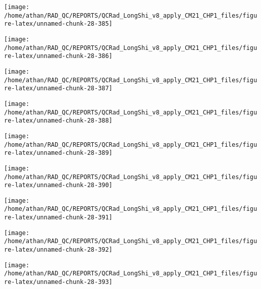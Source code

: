 \documentclass[
  10pt,
  a4paper,oneside]{article}
\begin{document}
\begin{center}\texttt{[image: /home/athan/RAD\_QC/REPORTS/QCRad\_LongShi\_v8\_apply\_CM21\_CHP1\_files/figure-latex/unnamed-chunk-28-385]} \end{center}

\begin{center}\texttt{[image: /home/athan/RAD\_QC/REPORTS/QCRad\_LongShi\_v8\_apply\_CM21\_CHP1\_files/figure-latex/unnamed-chunk-28-386]} \end{center}

\begin{center}\texttt{[image: /home/athan/RAD\_QC/REPORTS/QCRad\_LongShi\_v8\_apply\_CM21\_CHP1\_files/figure-latex/unnamed-chunk-28-387]} \end{center}

\begin{center}\texttt{[image: /home/athan/RAD\_QC/REPORTS/QCRad\_LongShi\_v8\_apply\_CM21\_CHP1\_files/figure-latex/unnamed-chunk-28-388]} \end{center}

\begin{center}\texttt{[image: /home/athan/RAD\_QC/REPORTS/QCRad\_LongShi\_v8\_apply\_CM21\_CHP1\_files/figure-latex/unnamed-chunk-28-389]} \end{center}

\begin{center}\texttt{[image: /home/athan/RAD\_QC/REPORTS/QCRad\_LongShi\_v8\_apply\_CM21\_CHP1\_files/figure-latex/unnamed-chunk-28-390]} \end{center}

\begin{center}\texttt{[image: /home/athan/RAD\_QC/REPORTS/QCRad\_LongShi\_v8\_apply\_CM21\_CHP1\_files/figure-latex/unnamed-chunk-28-391]} \end{center}

\begin{center}\texttt{[image: /home/athan/RAD\_QC/REPORTS/QCRad\_LongShi\_v8\_apply\_CM21\_CHP1\_files/figure-latex/unnamed-chunk-28-392]} \end{center}

\begin{center}\texttt{[image: /home/athan/RAD\_QC/REPORTS/QCRad\_LongShi\_v8\_apply\_CM21\_CHP1\_files/figure-latex/unnamed-chunk-28-393]} \end{center}
\end{document}

